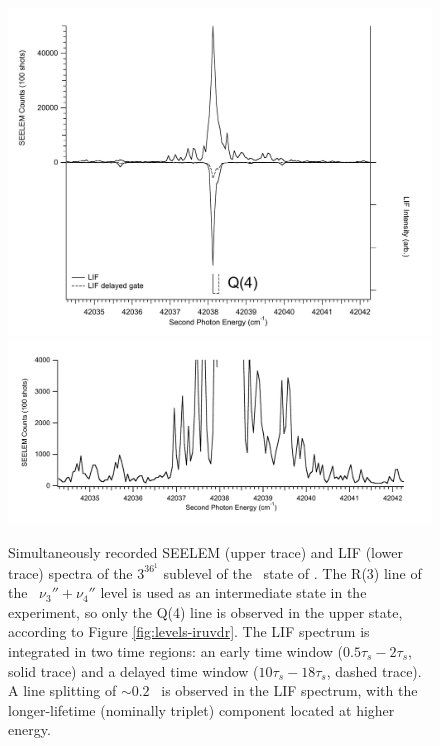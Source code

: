 \begin{figure}
  \caption{Simultaneously recorded SEELEM (upper trace) and LIF (lower
    trace) spectra of the $3^36^1$  sublevel of the \astate\
    state of .  The R(3) line of the \xstate\ $\nu_3'' +
    \nu_4''$ level is used as an intermediate state in the experiment,
    so only the Q(4) line is observed in the upper state, according to
    Figure \ref{fig:levels-iruvdr}.  The LIF spectrum is integrated in
    two time regions: an early time window ($0.5\tau_s-2\tau_s$, solid
    trace) and a delayed time window ($10\tau_s-18\tau_s$, dashed
    trace).  A line splitting of $\sim0.2$ \rcm\ is observed in the LIF
    spectrum, with the longer-lifetime (nominally triplet) component
    located at higher energy.}
  \label{fig:3361-q4}
  \centering
  \includegraphics[width=6in]{spectrum-3361-q4-split.pdf}
  \includegraphics[width=6in]{spectrum-3361-q4-zoom.pdf}
\end{figure}

